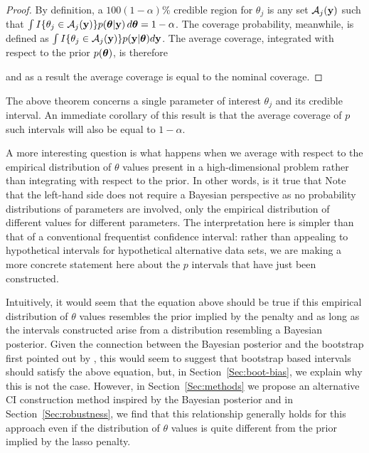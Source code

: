 \begin{proof}
  By definition, a $100(1-\alpha)\%$ credible region for $\theta_j$ is any set $\mathcal{A}_j(\mathbf{y})$ such that $\int I\{\theta_j \in \mathcal{A}_j(\mathbf{y})\} p(\boldsymbol{\theta}|\mathbf{y})\,d\boldsymbol{\theta} = 1 - \alpha$. The coverage probability, meanwhile, is defined as $\int I\{\theta_j \in \mathcal{A}_j(\mathbf{y})\} p(\mathbf{y} | \boldsymbol{\theta})d\mathbf{y}$. The average coverage, integrated with respect to the prior $p(\boldsymbol{\theta})$, is therefore


  \noindent and as a result the average coverage is equal to the nominal coverage.
\end{proof}

The above theorem concerns a single parameter of interest $\theta_j$ and its credible interval. An immediate corollary of this result is that the average coverage of $p$ such intervals will also be equal to $1-\alpha$.

A more interesting question is what happens when we average with respect to the empirical distribution of $\theta$ values present in a high-dimensional problem rather than integrating with respect to the prior. In other words, is it true that
Note that the left-hand side does not require a Bayesian perspective as no probability distributions of parameters are involved, only the empirical distribution of different values for different parameters. The interpretation here is simpler than that of a conventional frequentist confidence interval: rather than appealing to hypothetical intervals for hypothetical alternative data sets, we are making a more concrete statement here about the $p$ intervals that have just been constructed.

Intuitively, it would seem that the equation above should be true if this empirical distribution of $\theta$ values resembles the prior implied by the penalty and as long as the intervals constructed arise from a distribution resembling a Bayesian posterior. Given the connection between the Bayesian posterior and the bootstrap first pointed out by \cite{Rubin1981}, this would seem to suggest that bootstrap based intervals should satisfy the above equation, but, in Section~\ref{Sec:boot-bias}, we explain why this is not the case. However, in Section~\ref{Sec:methods} we propose an alternative CI construction method inspired by the Bayesian posterior and in Section~\ref{Sec:robustness}, we find that this relationship generally holds for this approach even if the distribution of $\theta$ values is quite different from the prior implied by the lasso penalty.

